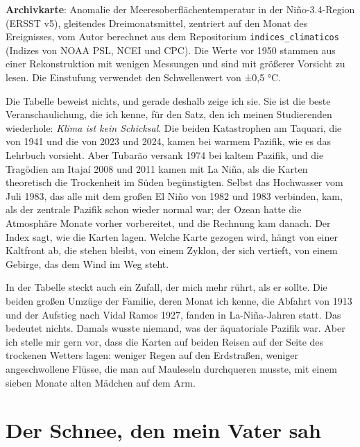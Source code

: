 \documentclass[
  ngerman,
  11pt,
  openany]{book}
\begin{document}
\begin{ficha}

\textbf{Archivkarte}: Anomalie der Meeresoberflächentemperatur in der
Niño-3.4-Region (ERSST v5), gleitendes Dreimonatsmittel, zentriert auf
den Monat des Ereignisses, vom Autor berechnet aus dem Repositorium
\texttt{indices\_climaticos} (Indizes von NOAA PSL, NCEI und CPC). Die
Werte vor 1950 stammen aus einer Rekonstruktion mit wenigen Messungen
und sind mit größerer Vorsicht zu lesen. Die Einstufung verwendet den
Schwellenwert von ±0,5 °C.

\end{ficha}

Die Tabelle beweist nichts, und gerade deshalb zeige ich sie. Sie ist
die beste Veranschaulichung, die ich kenne, für den Satz, den ich meinen
Studierenden wiederhole: \emph{Klima ist kein Schicksal}. Die beiden
Katastrophen am Taquari, die von 1941 und die von 2023 und 2024, kamen
bei warmem Pazifik, wie es das Lehrbuch vorsieht. Aber Tubarão versank
1974 bei kaltem Pazifik, und die Tragödien am Itajaí 2008 und 2011 kamen
mit La Niña, als die Karten theoretisch die Trockenheit im Süden
begünstigten. Selbst das Hochwasser vom Juli 1983, das alle mit dem
großen El Niño von 1982 und 1983 verbinden, kam, als der zentrale
Pazifik schon wieder normal war; der Ozean hatte die Atmosphäre Monate
vorher vorbereitet, und die Rechnung kam danach. Der Index sagt, wie die
Karten lagen. Welche Karte gezogen wird, hängt von einer Kaltfront ab,
die stehen bleibt, von einem Zyklon, der sich vertieft, von einem
Gebirge, das dem Wind im Weg steht.

In der Tabelle steckt auch ein Zufall, der mich mehr rührt, als er
sollte. Die beiden großen Umzüge der Familie, deren Monat ich kenne, die
Abfahrt von 1913 und der Aufstieg nach Vidal Ramos 1927, fanden in
La-Niña-Jahren statt. Das bedeutet nichts. Damals wusste niemand, was
der äquatoriale Pazifik war. Aber ich stelle mir gern vor, dass die
Karten auf beiden Reisen auf der Seite des trockenen Wetters lagen:
weniger Regen auf den Erdstraßen, weniger angeschwollene Flüsse, die man
auf Mauleseln durchqueren musste, mit einem sieben Monate alten Mädchen
auf dem Arm.

\section{Der Schnee, den mein Vater
sah}\label{der-schnee-den-mein-vater-sah}
\end{document}
